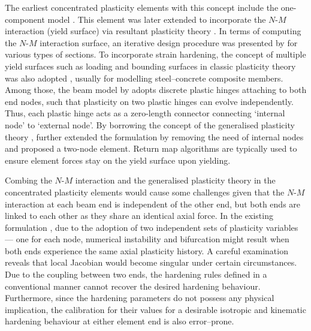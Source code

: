 The earliest concentrated plasticity elements with this concept include the one-component model \citep{Giberson:67:OneComponent}.
This element was later extended to incorporate the $N$-$M$ interaction (yield surface) via resultant plasticity theory \citep{Orbison:et:al:82:YieldSurface}.
In terms of computing the $N$-$M$ interaction surface, an iterative design procedure was presented by \citet{Liu:et:al:12:CrossSection} for various types of sections.
To incorporate strain hardening, the concept of multiple yield surfaces such as loading and bounding surfaces \citep[e.g.,][]{Iwan:67:Yielding,Mroz:67:AnisoHardening,Mroz:69:GeneralHardening,Dafalias:Popov:75:YieldSurface,Dafalias:Popov:77:YieldSurface} in classic plasticity theory was also adopted \citep[e.g.,][]{Hilmy:Abel:85:PHElement,Hajjar:Gourley:97:PHElement}, usually for modelling steel--concrete composite members.
Among those, the beam model by \citet{Powell:Chen:86:GeneralizedPH} adopts discrete plastic hinges attaching to both end nodes, such that plasticity on two plastic hinges can evolve independently. Thus, each plastic hinge acts as a zero-length connector connecting `internal node' to `external node'.
By borrowing the concept of the generalised plasticity theory \citep{Auricchio1994}, \citet{Kostic:et:al:11:EfficientBCElem0,Kostic:et:al:13:EfficientBCElem,Kostic:et:al:16:GenPlasticity} further extended the formulation by removing the need of internal nodes and proposed a two-node element. Return map algorithms are typically used to ensure element forces stay on the yield surface upon yielding.

Combing the $N$-$M$ interaction and the generalised plasticity theory in the concentrated plasticity elements would cause some challenges given that the $N$-$M$ interaction at each beam end is independent of the other end, but both ends are linked to each other as they share an identical axial force.
In the existing formulation \citep{Kostic:et:al:11:EfficientBCElem0,Kostic:et:al:13:EfficientBCElem,Kostic:et:al:16:GenPlasticity}, due to the adoption of two independent sets of plasticity variables --- one for each node, numerical instability and bifurcation might result when both ends experience the same axial plasticity history. A careful examination reveals that local Jacobian would become singular under certain circumstances.
Due to the coupling between two ends, the hardening rules defined in a conventional manner cannot recover the desired hardening behaviour.
Furthermore, since the hardening parameters do not possess any physical implication, the calibration for their values for a desirable isotropic and kinematic hardening behaviour at either element end is also error--prone.

